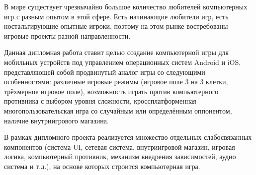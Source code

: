 В мире существует чрезвычайно большое количество любителей компьютерных игр с разным опытом в этой сфере. Есть начинающие любители игр, есть ностальгирующие опытные игроки, поэтому на этом рынке востребованы игровые проекты разной направленности.

Данная дипломная работа ставит целью создание компьютерной игры для мобильных устройств под управлением операционных систем Android и iOS, представляющей собой продвинутый аналог игры \TicTacToe со следующими особенностями: различные игровые режимы (игровое поле 3 на 3 клетки, трёхмерное игровое поле), возможность играть против компьютерного противника с выбором уровня сложности, кроссплатформенная многопользовательская игра со случайным или определённым оппонентом, наличие внутриигрового магазина.

В рамках дипломного проекта реализуется множество отдельных слабосвязанных компонентов (система UI, сетевая система, внутриигровой магазин, игровая логика, компьютерный противник, механизм внедрения зависимостей, аудио система и т.д.), на основе которых строится компьютерная игра.